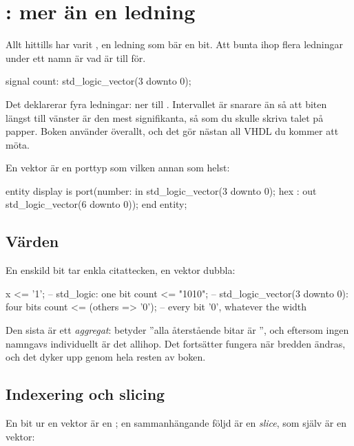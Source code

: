 \section{: mer än en ledning}
\label{c2:sec:vectors}

Allt hittills har varit , en ledning som bär en bit. Att bunta ihop flera ledningar
under ett namn är vad  är till för.

\begin{vhdlcode}
signal count: std_logic_vector(3 downto 0);
\end{vhdlcode}

Det deklarerar fyra ledningar:  ner till . Intervallet är
 snarare än  så att biten längst till vänster är den mest
signifikanta, så som du skulle skriva talet på papper. Boken använder  överallt, och
det gör nästan all VHDL du kommer att möta.

En vektor är en porttyp som vilken annan som helst:

\begin{vhdlcode}
entity display is
    port(number: in  std_logic_vector(3 downto 0);
         hex   : out std_logic_vector(6 downto 0));
end entity;
\end{vhdlcode}

\subsection*{Värden}
En enskild bit tar enkla citattecken, en vektor dubbla:

\begin{vhdlcode}
x     <= '1';                -- std_logic: one bit
count <= "1010";             -- std_logic_vector(3 downto 0): four bits
count <= (others => '0');    -- every bit '0', whatever the width
\end{vhdlcode}

Den sista är ett \emph{aggregat}:  betyder ”alla återstående bitar är
”, och eftersom ingen namngavs individuellt är det allihop. Det fortsätter fungera när
bredden ändras, och det dyker upp genom hela resten av boken.

\subsection*{Indexering och slicing}
En bit ur en vektor är en ; en sammanhängande följd är en \emph{slice}, som själv
är en vektor:

